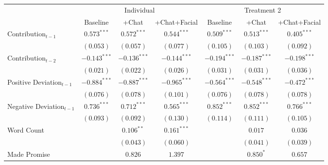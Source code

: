 
\begin{adjustbox}{max width=\textwidth}
\begin{tabular}{l c c c c c c}
\toprule
 & \multicolumn{3}{c}{Individual} & \multicolumn{3}{c}{Treatment 2} \\
\cmidrule(lr){2-4} \cmidrule(lr){5-7}
 & Baseline & +Chat & +Chat+Facial & Baseline & +Chat & +Chat+Facial \\
\midrule
Contribution$_{t-1}$                              & $0.573^{***}$   & $0.572^{***}$   & $0.544^{***}$   & $0.509^{***}$  & $0.513^{***}$  & $0.405^{***}$  \\
                                                  & $(0.053)$       & $(0.057)$       & $(0.077)$       & $(0.105)$      & $(0.103)$      & $(0.092)$      \\
Contribution$_{t-2}$                              & $-0.143^{***}$  & $-0.136^{***}$  & $-0.144^{***}$  & $-0.194^{***}$ & $-0.187^{***}$ & $-0.198^{***}$ \\
                                                  & $(0.021)$       & $(0.022)$       & $(0.026)$       & $(0.031)$      & $(0.031)$      & $(0.036)$      \\
Positive Deviation$_{t-1}$                        & $-0.884^{***}$  & $-0.887^{***}$  & $-0.965^{***}$  & $-0.564^{***}$ & $-0.548^{***}$ & $-0.472^{***}$ \\
                                                  & $(0.076)$       & $(0.078)$       & $(0.101)$       & $(0.076)$      & $(0.078)$      & $(0.078)$      \\
Negative Deviation$_{t-1}$                        & $0.736^{***}$   & $0.712^{***}$   & $0.565^{***}$   & $0.852^{***}$  & $0.852^{***}$  & $0.766^{***}$  \\
                                                  & $(0.093)$       & $(0.092)$       & $(0.130)$       & $(0.114)$      & $(0.111)$      & $(0.105)$      \\
Word Count                                        &                 & $0.106^{**}$    & $0.161^{***}$   &                & $0.017$        & $0.036$        \\
                                                  &                 & $(0.043)$       & $(0.060)$       &                & $(0.041)$      & $(0.039)$      \\
Made Promise                                      &                 & $0.826$         & $1.397$         &                & $0.850^{*}$    & $0.657$        \\

\end{tabular}
\end{adjustbox}
